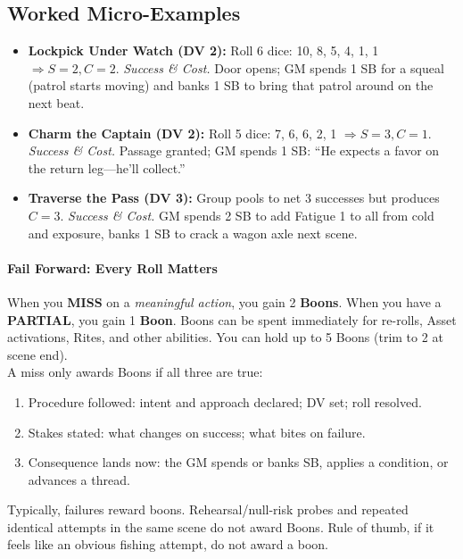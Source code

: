\subsection{Worked Micro-Examples}
\begin{itemize}
  \item \textbf{Lockpick Under Watch (DV 2):} Roll 6 dice: 10, 8, 5, 4, 1, 1 $\Rightarrow S=2, C=2$. \emph{Success \& Cost.} Door opens; GM spends 1 SB for a squeal (patrol starts moving) and banks 1 SB to bring that patrol around on the next beat.
  \item \textbf{Charm the Captain (DV 2):} Roll 5 dice: 7, 6, 6, 2, 1 $\Rightarrow S=3, C=1$. \emph{Success \& Cost.} Passage granted; GM spends 1 SB: ``He expects a favor on the return leg—he'll collect.''
  \item \textbf{Traverse the Pass (DV 3):} Group pools to net 3 successes but produces $C=3$. \emph{Success \& Cost.} GM spends 2 SB to add Fatigue 1 to all from cold and exposure, banks 1 SB to crack a wagon axle next scene.
\end{itemize}

\paragraph{Fail Forward: Every Roll Matters}
When you \textbf{MISS} on a \emph{meaningful action}, you gain 2 \textbf{Boons}. When you have a \textbf{PARTIAL}, you gain 1 \textbf{Boon}. Boons can be spent immediately for re-rolls, Asset activations, Rites, and other abilities. You can hold up to 5 Boons (trim to 2 at scene end).\\
A miss only awards Boons if all three are true:
\begin{enumerate}
  \item Procedure followed: intent and approach declared; DV set; roll resolved.
  \item Stakes stated: what changes on success; what bites on failure.
  \item Consequence lands now: the GM spends or banks SB, applies a condition, or advances a thread.
\end{enumerate}
Typically, failures reward boons. Rehearsal/null-risk probes and repeated identical attempts in the same scene do not award Boons. Rule of thumb, if it feels like an obvious fishing attempt, do not award a boon.
